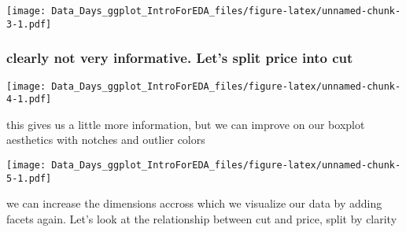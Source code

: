 \documentclass[
]{article}
\newenvironment{Shaded}{\begin{snugshade}}{\end{snugshade}}
\newcommand{\DataTypeTok}[1]{\textcolor[rgb]{0.13,0.29,0.53}{#1}}
\newcommand{\KeywordTok}[1]{\textcolor[rgb]{0.13,0.29,0.53}{\textbf{#1}}}
\newcommand{\NormalTok}[1]{#1}
\newcommand{\OperatorTok}[1]{\textcolor[rgb]{0.81,0.36,0.00}{\textbf{#1}}}
\newcommand{\OtherTok}[1]{\textcolor[rgb]{0.56,0.35,0.01}{#1}}
\newcommand{\StringTok}[1]{\textcolor[rgb]{0.31,0.60,0.02}{#1}}
\begin{document}
\texttt{[image: Data\_Days\_ggplot\_IntroForEDA\_files/figure-latex/unnamed-chunk-3-1.pdf]}

\hypertarget{clearly-not-very-informative.-lets-split-price-into-cut}{%
\subsubsection{clearly not very informative. Let's split price into
cut}\label{clearly-not-very-informative.-lets-split-price-into-cut}}

\begin{Shaded}
\end{Shaded}

\texttt{[image: Data\_Days\_ggplot\_IntroForEDA\_files/figure-latex/unnamed-chunk-4-1.pdf]}

this gives us a little more information, but we can improve on our
boxplot aesthetics with notches and outlier colors

\begin{Shaded}
\end{Shaded}

\texttt{[image: Data\_Days\_ggplot\_IntroForEDA\_files/figure-latex/unnamed-chunk-5-1.pdf]}

we can increase the dimensions accross which we visualize our data by
adding facets again. Let's look at the relationship between cut and
price, split by clarity

\begin{Shaded}
\end{Shaded}
\end{document}
